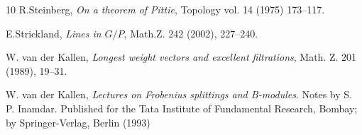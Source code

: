 \documentclass[sn-mathphys-num]{sn-jnl}%
\theoremstyle{definition}
\begin{document}
\begin{thebibliography}{10}
R.Steinberg, {\it On a theorem of Pittie}, Topology vol. 14 (1975) 173--117.

E.Strickland, {\it Lines in $ G/P$}, Math.Z. 242 (2002), 227--240.


W. van der Kallen, {\it Longest weight vectors and excellent filtrations}, Math. Z. 201 (1989), 19--31.

W. van der Kallen, {\it Lectures on Frobenius splittings and B-modules}. Notes by S. P. Inamdar. Published for the Tata Institute of Fundamental Research, Bombay; by Springer-Verlag, Berlin (1993)

\end{thebibliography}
\end{document}
